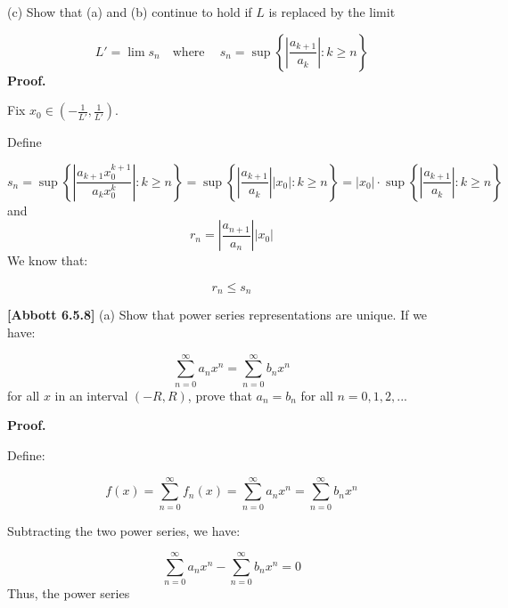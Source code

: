 \documentclass[10pt]{article}
\begin{document}
(c) Show that (a) and (b) continue to hold if $\displaystyle L$ is replaced by the limit


\begin{equation*}
L'=\lim s_{n} \quad \text{where} \ \quad s_{n} =\sup \left\{\left| \frac{a_{k+1}}{a_{k}}\right| :k\geq n\right\}
\end{equation*}
\textbf{Proof.}



Fix $\displaystyle x_{0} \in \left( -\frac{1}{L'} ,\frac{1}{L'}\right)$. 



Define


\begin{equation*}
s_{n} =\sup \left\{\left| \frac{a_{k+1} x_{0}^{k+1}}{a_{k} x_{0}^{k}}\right| :k\geq n\right\} =\sup \left\{\left| \frac{a_{k+1}}{a_{k}}\right| |x_{0} |:k\geq n\right\} =|x_{0} |\cdot \sup \left\{\left| \frac{a_{k+1}}{a_{k}}\right| :k\geq n\right\}
\end{equation*}
and
\begin{equation*}
r_{n} =\left| \frac{a_{n+1}}{a_{n}}\right| |x_{0} |
\end{equation*}
We know that:


\begin{equation*}
r_{n} \leq s_{n}
\end{equation*}


\textbf{[Abbott 6.5.8]} (a) Show that power series representations are unique. If we have:


\begin{equation*}
\sum _{n=0}^{\infty } a_{n} x^{n} =\sum _{n=0}^{\infty } b_{n} x^{n}
\end{equation*}
for all $\displaystyle x$ in an interval $\displaystyle ( -R,R)$, prove that $\displaystyle a_{n} =b_{n}$ for all $\displaystyle n=0,1,2,...$



\textbf{Proof.}



Define:


\begin{equation*}
f( x) =\sum _{n=0}^{\infty } f_{n}( x) =\sum _{n=0}^{\infty } a_{n} x^{n} =\sum _{n=0}^{\infty } b_{n} x^{n}
\end{equation*}




Subtracting the two power series, we have:


\begin{equation*}
\sum _{n=0}^{\infty } a_{n} x^{n} -\sum _{n=0}^{\infty } b_{n} x^{n} =0
\end{equation*}
Thus, the power series 
\end{document}
